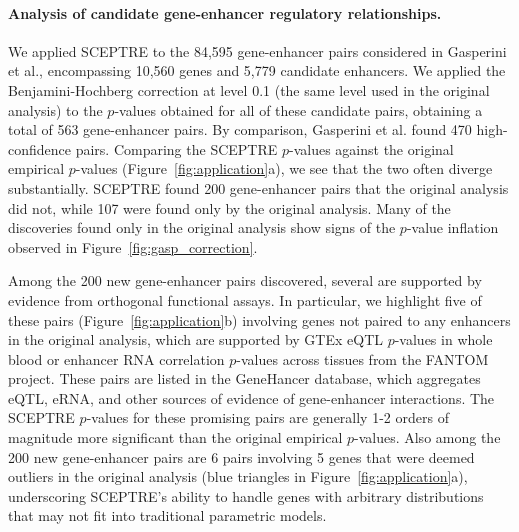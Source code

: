 \documentclass{nature}
\begin{document}
\paragraph{Analysis of candidate gene-enhancer regulatory relationships.}

We applied SCEPTRE to the 84,595 gene-enhancer pairs considered in Gasperini et al., encompassing 10,560 genes and 5,779 candidate enhancers. We applied the Benjamini-Hochberg correction at level 0.1 (the same level used in the original analysis) to the $p$-values obtained for all of these candidate pairs, obtaining a total of 563 gene-enhancer pairs. By comparison, Gasperini et al. found 470 high-confidence pairs. Comparing the SCEPTRE $p$-values against the original empirical $p$-values (Figure~\ref{fig:application}a), we see that the two often diverge substantially. SCEPTRE found 200 gene-enhancer pairs that the original analysis did not, while 107 were found only by the original analysis. Many of the discoveries found only in the original analysis show signs of the $p$-value inflation observed in Figure~\ref{fig:gasp_correction}. 

Among the 200 new gene-enhancer pairs discovered, several are supported by evidence from orthogonal functional assays. In particular, we highlight five of these pairs (Figure~\ref{fig:application}b) involving genes not paired to any enhancers in the original analysis, which are supported by GTEx\cite{GTExPilot} eQTL $p$-values in whole blood or enhancer RNA correlation $p$-values across tissues from the FANTOM project\cite{Andersson2014}. These pairs are listed in the GeneHancer database\cite{Fishilevich2017}, which aggregates eQTL, eRNA, and other sources of evidence of gene-enhancer interactions. The SCEPTRE $p$-values for these promising pairs are generally 1-2 orders of magnitude more significant than the original empirical $p$-values. Also among the 200 new gene-enhancer pairs are 6 pairs involving 5 genes that were deemed outliers in the original analysis (blue triangles in Figure~\ref{fig:application}a), underscoring SCEPTRE's ability to handle genes with arbitrary distributions that may not fit into traditional parametric models. 
\end{document}
